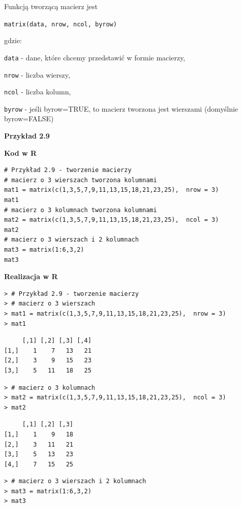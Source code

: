 \documentclass[12pt,B5paper,]{book}
\begin{document}
Funkcją tworzącą macierz jest

\begin{center}
\texttt{matrix(data, nrow, ncol, byrow)}
\end{center}

gdzie:

\texttt{data} - dane, które chcemy przedstawić w formie macierzy,

\texttt{nrow} - liczba wierszy,

\texttt{ncol} - liczba kolumn,

\texttt{byrow} - jeśli byrow=TRUE, to macierz tworzona jest wierszami
(domyślnie byrow=FALSE)

\vspace{0.8cm}

\textbf{Przykład 2.9}

\textbf{Kod w R}

\begin{verbatim}
# Przykład 2.9 - tworzenie macierzy
# macierz o 3 wierszach tworzona kolumnami
mat1 = matrix(c(1,3,5,7,9,11,13,15,18,21,23,25),  nrow = 3)  
mat1
# macierz o 3 kolumnach tworzona kolumnami
mat2 = matrix(c(1,3,5,7,9,11,13,15,18,21,23,25),  ncol = 3)  
mat2
# macierz o 3 wierszach i 2 kolumnach
mat3 = matrix(1:6,3,2)  
mat3
\end{verbatim}

\vspace{0.8cm} \textbf{Realizacja w R}

\begin{verbatim}
> # Przykład 2.9 - tworzenie macierzy
> # macierz o 3 wierszach
> mat1 = matrix(c(1,3,5,7,9,11,13,15,18,21,23,25),  nrow = 3)  
> mat1
\end{verbatim}

\begin{verbatim}
     [,1] [,2] [,3] [,4]
[1,]    1    7   13   21
[2,]    3    9   15   23
[3,]    5   11   18   25
\end{verbatim}

\begin{verbatim}
> # macierz o 3 kolumnach
> mat2 = matrix(c(1,3,5,7,9,11,13,15,18,21,23,25),  ncol = 3)  
> mat2
\end{verbatim}

\begin{verbatim}
     [,1] [,2] [,3]
[1,]    1    9   18
[2,]    3   11   21
[3,]    5   13   23
[4,]    7   15   25
\end{verbatim}

\begin{verbatim}
> # macierz o 3 wierszach i 2 kolumnach
> mat3 = matrix(1:6,3,2)    
> mat3
\end{verbatim}
\end{document}
